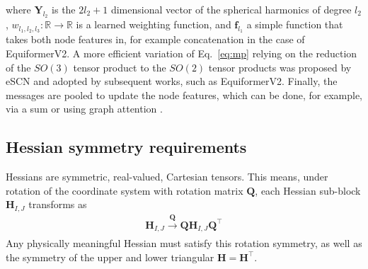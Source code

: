 \documentclass[pdflatex,sn-mathphys-num]{sn-jnl}%
\begin{document}
where $\mathbf{Y}_{l_2}$ is the $2l_2+1$ dimensional vector of the spherical harmonics of degree $l_2$, $w_{l_1, l_2, l_3}: \mathbb{R} \rightarrow \mathbb{R}$ is a learned weighting function, and $\mathbf{f}_{l_1}$ a simple function that takes both node features in, for example concatenation in the case of EquiformerV2.
A more efficient variation of Eq.~\eqref{eq:mp} relying on the reduction of the $SO(3)$ tensor product to the $SO(2)$ tensor products was proposed by eSCN \citep{eSCN2023} and adopted by subsequent works, such as EquiformerV2.
Finally, the messages are pooled to update the node features, which can be done, for example, via a sum or using graph attention \citep{liao2023equiformerv2}.

\subsection{Hessian symmetry requirements}
Hessians are symmetric, real-valued, Cartesian tensors. This means, under rotation of the coordinate system with rotation matrix $\mathbf{Q}$, each Hessian sub-block $\mathbf{H}_{I,J}$ transforms as 
\begin{align}
    \mathbf{H}_{I,J} \xrightarrow[]{\mathbf{Q}} \mathbf{Q} \mathbf{H}_{I,J} \mathbf{Q}^\top \label{eq:hessian_symmetry}
\end{align}
Any physically meaningful Hessian must satisfy this rotation symmetry, as well as the symmetry of the upper and lower triangular $\mathbf{H}=\mathbf{H}^\top$.
\end{document}
